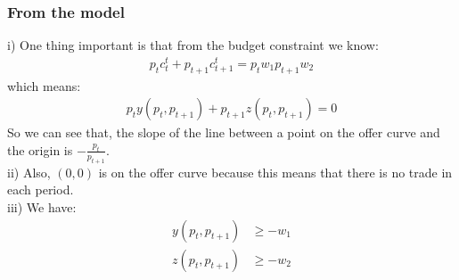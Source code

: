 \documentclass{article}
\begin{document}
\subsubsection{From the model}
i) One thing important is that from the budget constraint we know:
	\begin{align*}
		p_t c^t_t + p_{t+1} c^t_{t+1} = p_t w_1 p_{t+1} w_2
	\end{align*}
which means:
	\begin{align*}
		p_t y(p_t, p_{t+1}) + p_{t+1} z(p_t, p_{t+1}) = 0
	\end{align*} 
So we can see that, the slope of the line between a point on the offer curve and the origin is $-\frac{p_t}{p_{t+1}}$.\\
ii) Also, $(0, 0)$ is on the offer curve because this means that there is no trade in each period.\\
iii) We have:
	\begin{align*}
		y(p_t, p_{t+1}) &\geq -w_1\\
		z(p_t, p_{t+1}) &\geq -w_2
	\end{align*}
\end{document}

